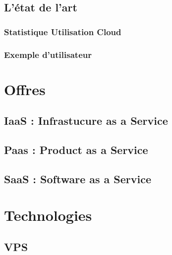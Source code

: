 \documentclass[11pt]{book}
\begin{document}
\subsection{L'état de l'art}\label{sec-ltat-de-lart}%

\subsubsection{Statistique Utilisation Cloud}\label{sec-statistique-utilisation-cloud}%

\subsubsection{Exemple d'utilisateur}\label{sec-exemple-dutilisateur}%

\section{Offres}\label{sec-offres}%

\subsection{IaaS : Infrastucure as a Service}\label{sec-iaas---infrastucure-as-a-service}%

\subsection{Paas : Product as a Service}\label{sec-paas---product-as-a-service}%

\subsection{SaaS    : Software as a Service}\label{sec-saas---software-as-a-service}%

\section{Technologies}\label{sec-technologies}%

\subsection{VPS}\label{sec-vps}%
\end{document}
